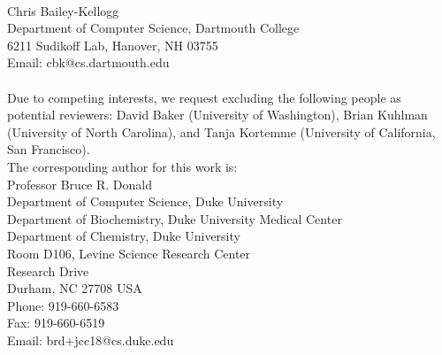 \documentclass[11pt, oneside]{article}   	%
\begin{document}
   \\\hspace{-0.285in} Chris Bailey-Kellogg \\Department of Computer Science, Dartmouth College \\6211 Sudikoff Lab, Hanover, NH 03755 \\Email: cbk@cs.dartmouth.edu \\
   \bigskip
   \\
   Due to competing interests, we request excluding the following people as potential reviewers: David Baker (University of Washington), Brian Kuhlman (University of North Carolina), and Tanja Kortemme (University of California, San Francisco).  
   \\
   
   The corresponding author for this work is: 
 \bigskip
 \\
    \hspace{-0.285in} Professor Bruce R. Donald \\Department of Computer Science, Duke University \\Department of Biochemistry, Duke University Medical Center  \\Department of Chemistry, Duke University \\Room D106, Levine Science Research Center \\Research Drive \\Durham, NC 27708 USA \\Phone: 919-660-6583 \\Fax: 919-660-6519 \\Email: brd+jcc18@cs.duke.edu \\
\end{document}

